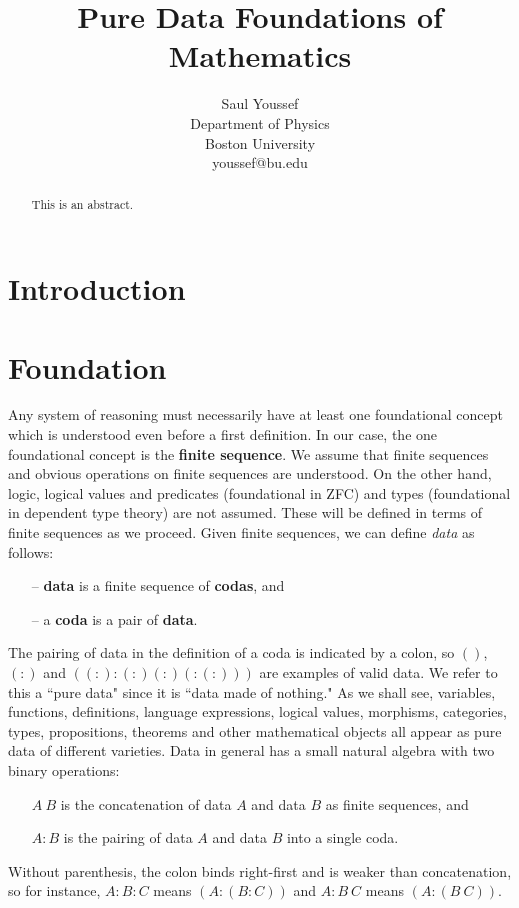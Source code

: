 \documentclass[11pt]{article}
\begin{document}
\title{Pure Data Foundations of Mathematics}
\author{%
  Saul Youssef%
  \hfil \\
  Department of Physics \\
  Boston University \\
  youssef@bu.edu\\
}
\maketitle
\begin{abstract}
This is an abstract.
\end{abstract}

\section{Introduction}
\section{Foundation} 

     Any system of reasoning must necessarily have at least one foundational concept which is understood even before a first definition.  In our case, the one foundational concept is the {\bf finite sequence}.  We assume that finite sequences and obvious operations on finite sequences are understood.  On the other hand, logic, logical values and predicates (foundational in ZFC) and types (foundational in dependent type theory) are not assumed.  These will be defined in terms of finite sequences as we proceed.   
Given finite sequences, we can define {\it data} as follows:
\begin{itemize}
\item[--] {\bf data} is a finite sequence of {\bf codas}, and 
\item[--] a {\bf coda} is a pair of {\bf data}.
\end{itemize}
The pairing of data in the definition of a coda is indicated by a colon, so $()$, $(:)$ and $((:):(:)(:)(:(:)))$ are examples of valid data.  We refer to this a ``pure data" since it is ``data made of nothing."  As we shall see, variables, functions, definitions, language expressions, logical values, morphisms, categories, types, propositions, theorems and other mathematical objects all appear as pure data of different varieties.  Data in general has a small natural algebra with two binary operations:
\begin{enumerate}
\item[] $A\ B$ is the concatenation of data $A$ and data $B$ as finite sequences, and 
\item[] $A:B$ is the pairing of data $A$ and data $B$ into a single coda. 
\end{enumerate}
 Without parenthesis, the colon binds right-first and is weaker than concatenation, so for instance, $A:B:C$ means $(A:(B:C))$ and 
$A : B\ C$ means $(A:(B\  C))$.
\end{document}
